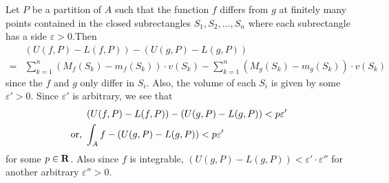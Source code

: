 \begin{solution}
    Let $P$ be a partition of $A$ such that
    the function $f$ differs from $g$ at
    finitely many points contained in the closed
    subrectangles $S_1, S_2,..., S_n$ where each
    subrectangle has a side $\varepsilon>0$.Then
    \begin{align*}
        &\left(U(f, P)-L(f,P)\right)-\left(U(g,P)-
    L(g,P)\right)\\
    =&\sum_{k=1}^n{\left(M_f(S_k)-m_f(S_k)\right)
    \cdot v(S_k)}-\sum_{k=1}^n{\left(M_g(S_k)
    -m_g(S_k)\right)
    \cdot v(S_k)}
    \end{align*}
    since the $f$ and $g$ only differ in $S_i$.
    Also, the volume of each $S_i$ is given by
    some $\varepsilon'>0$. Since $\varepsilon'$
    is arbitrary, we see that
    \begin{align*}
        &\left(U(f, P)-L(f,P)\right)-
    \left(U(g,P)-L(g,P)\right)<p\varepsilon'\\
    \textnormal{or, }&\int_A{f}-\left(U(g,P)-
    L(g,P)\right)<p\varepsilon'
    \end{align*}
    for some $p\in\mathbf{R}$. Also since $f$ is
    integrable, $\left(U(g,P)-
    L(g,P)\right)<\varepsilon'\cdot
    \varepsilon''$ for
    another arbitrary $\varepsilon''>0$.
\end{solution}